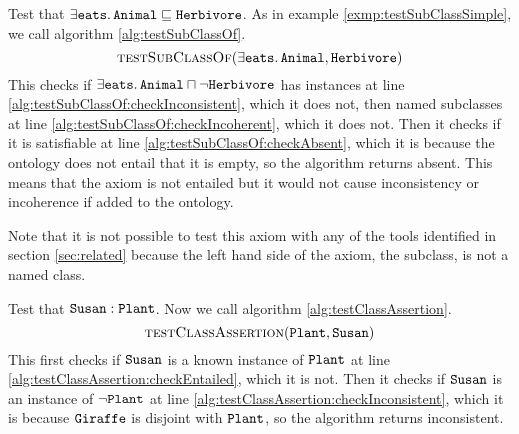 \documentclass[paper.tex]{subfiles}
\begin{document}
\begin{example}
  \label{exmp:testSubClassComplex}
  Test that $\exists \mathtt{eats} .\, \mathtt{Animal} \sqsubseteq \mathtt{Herbivore}$.
  As in example \ref{exmp:testSubClassSimple}, we call algorithm \ref{alg:testSubClassOf}.
  \[ \Call{testSubClassOf}{\exists \oent{eats} .\, \oent{Animal}, \oent{Herbivore}} \]
  This checks if $\exists \mathtt{eats} .\, \mathtt{Animal} \sqcap \neg \mathtt{Herbivore}$ has instances at line \ref{alg:testSubClassOf:checkInconsistent}, which it does not, then named subclasses at line \ref{alg:testSubClassOf:checkIncoherent}, which it does not.
  Then it checks if it is satisfiable at line \ref{alg:testSubClassOf:checkAbsent}, which it is because the ontology does not entail that it is empty, so the algorithm returns absent.
  This means that the axiom is not entailed but it would not cause inconsistency or incoherence if added to the ontology.

  Note that it is not possible to test this axiom with any of the tools identified in section \ref{sec:related} because the left hand side of the axiom, the subclass, is not a named class.
\end{example}


\begin{example}
  \label{exmp:testClassAssertion}
  Test that $\mathtt{Susan} : \mathtt{Plant}$.  Now we call algorithm \ref{alg:testClassAssertion}.
  \[ \Call{testClassAssertion}{\oent{Plant}, \oent{Susan}} \]
  This first checks if $\mathtt{Susan}$ is a known instance of $\mathtt{Plant}$ at line \ref{alg:testClassAssertion:checkEntailed}, which it is not.
  Then it checks if $\mathtt{Susan}$ is an instance of $\neg \mathtt{Plant}$ at line \ref{alg:testClassAssertion:checkInconsistent}, which it is because $\mathtt{Giraffe}$ is disjoint with $\mathtt{Plant}$, so the algorithm returns inconsistent.
\end{example}

\end{document}

